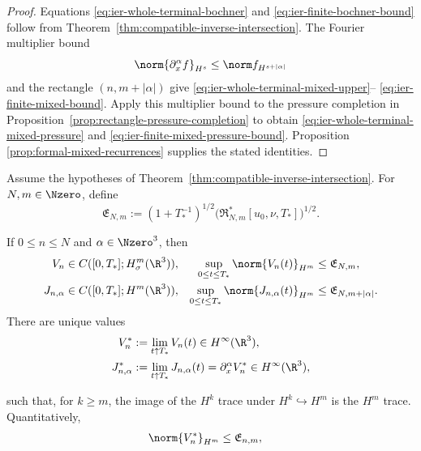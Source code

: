 \begin{proof}
Equations \eqref{eq:ier-whole-terminal-bochner} and
\eqref{eq:ier-finite-bochner-bound} follow from
Theorem~\ref{thm:compatible-inverse-intersection}.  The Fourier multiplier
bound
\[
 \norm{\partial_x^\alpha f}_{H^s}
 \le\norm f_{H^{s+|\alpha|}}
\]
and the rectangle \((n,m+|\alpha|)\) give
\eqref{eq:ier-whole-terminal-mixed-upper}--%
\eqref{eq:ier-finite-mixed-bound}.  Apply this multiplier bound to the
pressure completion in Proposition~\ref{prop:rectangle-pressure-completion}
to obtain \eqref{eq:ier-whole-terminal-mixed-pressure} and
\eqref{eq:ier-finite-mixed-pressure-bound}.  Proposition
\ref{prop:formal-mixed-recurrences} supplies the stated identities.
\end{proof}

\begin{theorem}
\label{thm:ier-compatible-endpoint-traces}
Assume the hypotheses of
Theorem~\ref{thm:compatible-inverse-intersection}.
For \(N,m\in\Nzero\), define
\begin{equation}
 \mathfrak E_{N,m}
 :=(1+T_*^{-1})^{1/2}
 \bigl(\mathfrak R_{N,m}^*[u_0,\nu,T_*]\bigr)^{1/2}.
 \label{eq:ier-endpoint-majorant}
\end{equation}
\begin{samepage}
If \(0\le n\le N\) and \(\alpha\in\Nzero^3\), then
\begin{align}
 V_n&\in C([0,T_*];H^m_\sigma(\R^3)),
 &\sup_{0\le t\le T_*}\norm{V_n(t)}_{H^m}
 &\le\mathfrak E_{N,m},
 \label{eq:ier-row-trace}\\
 J_{n,\alpha}&\in C([0,T_*];H^m(\R^3)),
 &\sup_{0\le t\le T_*}\norm{J_{n,\alpha}(t)}_{H^m}
 &\le\mathfrak E_{N,m+|\alpha|}.
 \label{eq:ier-mixed-row-trace}
\end{align}
There are unique values
\begin{align}
 V_n^*&:=\lim_{t\uparrow T_*}V_n(t)
 \in H^\infty(\R^3),
 \label{eq:ier-velocity-endpoint}\\
 J_{n,\alpha}^*&:=\lim_{t\uparrow T_*}J_{n,\alpha}(t)
 =\partial_x^\alpha V_n^*
 \in H^\infty(\R^3),
 \label{eq:ier-mixed-velocity-endpoint}
\end{align}
\par
\end{samepage}
such that, for \(k\ge m\), the image of the \(H^k\) trace under
\(H^k\hookrightarrow H^m\) is the \(H^m\) trace.  Quantitatively,
\begin{align}
 \norm{V_n^*}_{H^m}
 &\le\mathfrak E_{n,m},

\end{align}
\end{theorem}
